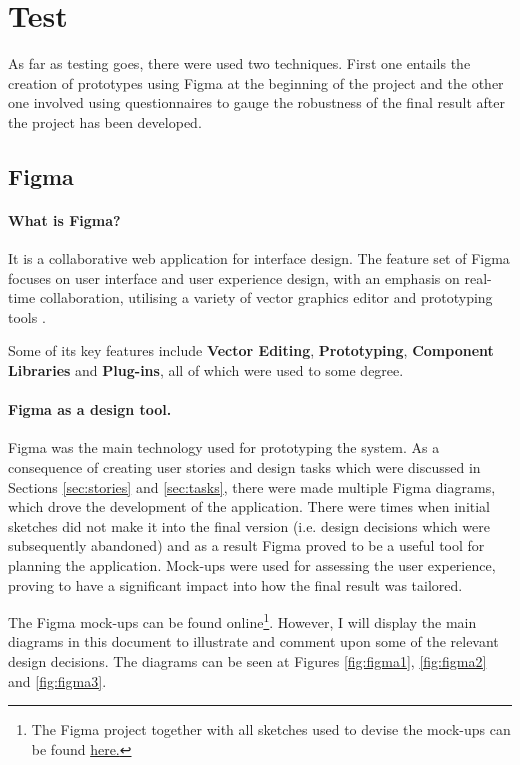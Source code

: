 \documentclass[multi, tikz, a4paper, oneside]{article}
\begin{document}
\section{Test}
As far as testing goes, there were used two techniques. First one entails the
creation of prototypes using Figma at the beginning of the project and the other
one involved using questionnaires to gauge the robustness of the final result
after the project has been developed.

\subsection{Figma}

\paragraph{What is Figma?}
It is a collaborative web application for interface design. The feature set of
Figma focuses on user interface and user experience design, with an emphasis on
real-time collaboration, utilising a variety of vector graphics editor and
prototyping tools \autocite{wiki:figma}.


Some of its key features include \textbf{Vector Editing}, \textbf{Prototyping},
\textbf{Component Libraries} and \textbf{Plug-ins}, all of which were used to
some degree.


\paragraph{Figma as a design tool.}
Figma was the main technology used for prototyping the system. As a consequence
of creating user stories and design tasks which were discussed in Sections
\ref{sec:stories} and \ref{sec:tasks}, there were made multiple Figma diagrams,
which drove the development of the application. There were times when initial
sketches did not make it into the final version (i.e. design decisions which
were subsequently abandoned) and as a result Figma proved to be a useful tool
for planning the application. Mock-ups were used for assessing the user
experience, proving to have a significant impact into how the final result was
tailored.


The Figma mock-ups can be found online\footnote{The Figma project together with
all sketches used to devise the mock-ups can be found
\href{https://www.figma.com/file/TGgkRNt5faxYmILkp60JdN/Docker-UI?type=design&node-id=0-1&mode=design&t=rZRXwLEom6yfP9AU-0}{here.}}.
However, I will display the main diagrams in this document to illustrate and
comment upon some of the relevant design decisions. The diagrams can be seen at
Figures \ref{fig:figma1}, \ref{fig:figma2} and \ref{fig:figma3}.
\end{document}

